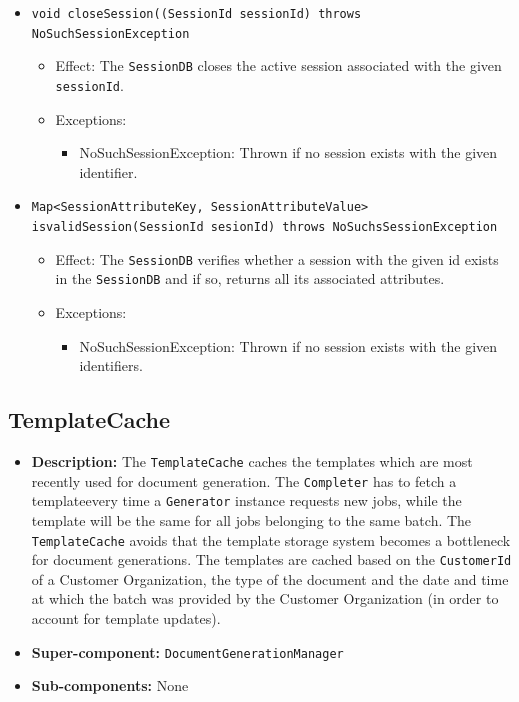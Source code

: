 \documentclass[a4paper,10pt]{article}
\begin{document}
\begin{itemize}
\begin{itemize}
        \item \texttt{void closeSession((SessionId sessionId) throws NoSuchSessionException}
        \begin{itemize}
             \item Effect: The \texttt{SessionDB} closes the active session associated with the given \texttt{sessionId}.
             \item Exceptions:
             \begin{itemize}
                \item NoSuchSessionException: Thrown if no session exists with the given identifier.
             \end{itemize}   
        \end{itemize}   
        
        \item \texttt{Map<SessionAttributeKey, SessionAttributeValue> isvalidSession(SessionId sesionId) throws NoSuchsSessionException}
        \begin{itemize}
            \item Effect: The \texttt{SessionDB} verifies whether a session with the given id exists in the \texttt{SessionDB} and if so, returns all its associated attributes.
            \item Exceptions:
            \begin{itemize}
                \item NoSuchSessionException: Thrown if no session exists with the given identifiers.
             \end{itemize}
        \end{itemize}   
    \end{itemize}
\end{itemize}


\subsection{TemplateCache}
\begin{itemize}
    \item \textbf{Description:}  The \texttt{TemplateCache} caches the templates which are most recently used for document generation. The \texttt{Completer} has to fetch a templateevery time a \texttt{Generator} instance requests new jobs, while the template will be the same for all jobs belonging to the same batch. The \texttt{TemplateCache} avoids that the template storage system becomes a bottleneck for document generations. The templates are cached based on the \texttt{CustomerId} of a Customer Organization, the type of the document and the date and time at which the batch was provided by the Customer Organization (in order to account for template updates).
    \item \textbf{Super-component:} \texttt{DocumentGenerationManager}
    \item \textbf{Sub-components:} None
\end{itemize}
\end{document}
